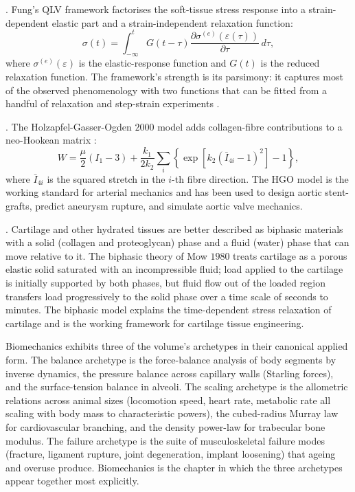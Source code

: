 . Fung's QLV framework
factorises the soft-tissue stress response into a strain-dependent
elastic part and a strain-independent relaxation function:
\[
\sigma(t) = \int_{-\infty}^{t} G(t - \tau) \frac{\partial \sigma^{(e)}(\varepsilon(\tau))}{\partial \tau} \, d\tau,
\]
where $\sigma^{(e)}(\varepsilon)$ is the elastic-response function
and $G(t)$ is the reduced relaxation function. The framework's
strength is its parsimony: it captures most of the observed
phenomenology with two functions that can be fitted from a handful
of relaxation and step-strain experiments \cite[ch.~7]{text:fung-biomechanics}.

. The
Holzapfel-Gasser-Ogden $2000$ model adds collagen-fibre
contributions to a neo-Hookean matrix
\cite[p.~15]{paper:v6c06-holzapfel-gasser-ogden-2000}:
\[
W = \frac{\mu}{2}(I_1 - 3)
  + \frac{k_1}{2 k_2} \sum_i \left\{
     \exp\!\left[k_2 (\bar{I}_{4i} - 1)^2\right] - 1 \right\},
\]
where $\bar{I}_{4i}$ is the squared stretch in the $i$-th fibre
direction. The HGO model is the working standard for arterial
mechanics and has been used to design aortic stent-grafts,
predict aneurysm rupture, and simulate aortic valve mechanics.

. Cartilage and other hydrated tissues are
better described as biphasic materials with a solid (collagen and
proteoglycan) phase and a fluid (water) phase that can move relative
to it. The biphasic theory of Mow $1980$
\cite[p.~75]{paper:v6c06-mow-1980} treats cartilage as a porous
elastic solid saturated with an incompressible fluid; load applied
to the cartilage is initially supported by both phases, but fluid
flow out of the loaded region transfers load progressively to the
solid phase over a time scale of seconds to minutes. The biphasic
model explains the time-dependent stress relaxation of cartilage
and is the working framework for cartilage tissue engineering.

\begin{archetype}
Biomechanics exhibits three of the volume's archetypes in their
canonical applied form. The balance archetype is the force-balance
analysis of body segments by inverse dynamics, the pressure balance
across capillary walls (Starling forces), and the surface-tension
balance in alveoli. The scaling archetype is the allometric
relations across animal sizes (locomotion speed, heart rate,
metabolic rate all scaling with body mass to characteristic powers),
the cubed-radius Murray law for cardiovascular branching, and the
density power-law for trabecular bone modulus. The failure archetype
is the suite of musculoskeletal failure modes (fracture, ligament
rupture, joint degeneration, implant loosening) that ageing and
overuse produce. Biomechanics is the chapter in which the three
archetypes appear together most explicitly.
\end{archetype}

